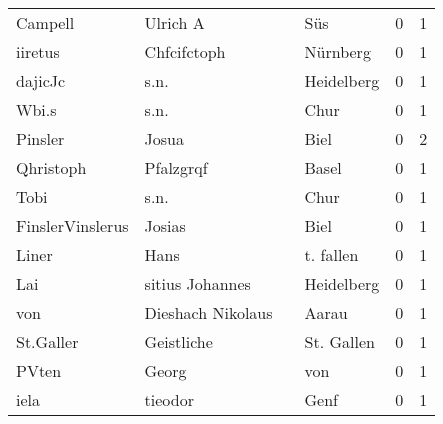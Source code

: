 \begin{tabular}{llllrr}
                  Campell &                           Ulrich A &             &                                         Süs &          0 &         1 \\
                  iiretus &                        Chfcifctoph &             &                                    Nürnberg &          0 &         1 \\
                  dajicJc &                               s.n. &             &                                  Heidelberg &          0 &         1 \\
                    Wbi.s &                               s.n. &             &                                        Chur &          0 &         1 \\
                  Pinsler &                              Josua &             &                                        Biel &          0 &         2 \\
                Qhristoph &                          Pfalzgrqf &             &                                       Basel &          0 &         1 \\
                     Tobi &                               s.n. &             &                                        Chur &          0 &         1 \\
         FinslerVinslerus &                             Josias &             &                                        Biel &          0 &         1 \\
                    Liner &                               Hans &             &                                   t. fallen &          0 &         1 \\
                      Lai &                    sitius Johannes &             &                                  Heidelberg &          0 &         1 \\
                      von &                  Dieshach Nikolaus &             &                                       Aarau &          0 &         1 \\
                St.Galler &                         Geistliche &             &                                  St. Gallen &          0 &         1 \\
                    PVten &                              Georg &             &                                         von &          0 &         1 \\
                     iela &                            tieodor &             &                                        Genf &          0 &         1 \\

\end{tabular}
